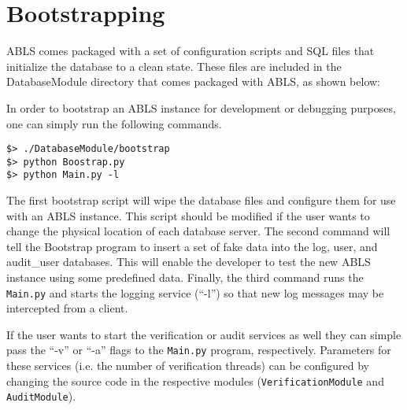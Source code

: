 \section{Bootstrapping}

ABLS comes packaged with a set of configuration scripts and SQL files that initialize
the database to a clean state. These files are included in the DatabaseModule directory
that comes packaged with ABLS, as shown below:


In order to bootstrap an ABLS instance for development or debugging purposes, one can simply run the 
following commands.

\begin{lstlisting}
$> ./DatabaseModule/bootstrap 
$> python Boostrap.py
$> python Main.py -l
\end{lstlisting}

The first bootstrap script will wipe the database files and configure them for use with an 
ABLS instance. This script should be modified if the user wants to change the physical
location of each database server. The second command will tell the Bootstrap program
to insert a set of fake data into the log, user, and audit\_user databases. This will enable
the developer to test the new ABLS instance using some predefined data. Finally, the third
command runs the {\tt Main.py} and starts the logging service (``-l'') so that new log messages
may be intercepted from a client.

If the user wants to start the verification or audit services as well they can simple pass the ``-v'' or
``-a'' flags to the {\tt Main.py} program, respectively. Parameters for these services (i.e. the number of 
verification threads) can be configured by changing the source code in the respective modules
({\tt VerificationModule} and {\tt AuditModule}).

